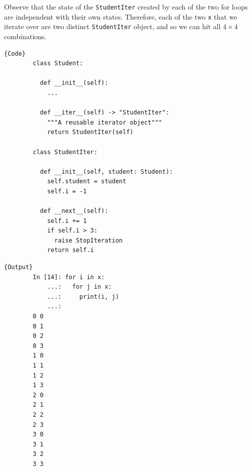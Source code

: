  \begin{theorem}
    \label{thm:separate-implementations-of-iterator-and}
    Observe that the state of the \texttt{StudentIter} created by each of the two for loops are independent with their own states. Therefore, each of the two \texttt{x} that we iterate over are two distinct \texttt{StudentIter} object, and so we can hit all $4 \times 4$ combinations. 

    \noindent\begin{minipage}{.5\textwidth}
      \begin{lstlisting}[]{Code}
        class Student: 

          def __init__(self): 
            ...

          def __iter__(self) -> "StudentIter":  
            """A reusable iterator object"""
            return StudentIter(self)

        class StudentIter: 

          def __init__(self, student: Student): 
            self.student = student 
            self.i = -1

          def __next__(self): 
            self.i += 1  
            if self.i > 3: 
              raise StopIteration
            return self.i
      \end{lstlisting}
      \end{minipage}
      \hfill
      \begin{minipage}{.49\textwidth}
      \begin{lstlisting}[]{Output}
        In [14]: for i in x:
            ...:   for j in x:
            ...:     print(i, j)
            ...: 
        0 0
        0 1
        0 2
        0 3
        1 0
        1 1
        1 2
        1 3
        2 0
        2 1
        2 2
        2 3
        3 0
        3 1
        3 2
        3 3
      \end{lstlisting}
    \end{minipage}
  \end{theorem}

